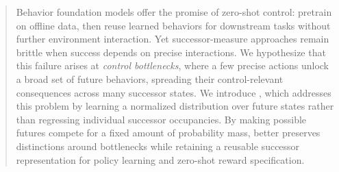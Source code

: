     

\begin{abstract}
Behavior foundation models offer the promise of zero-shot control: pretrain on offline data, then reuse learned behaviors for downstream tasks without further environment interaction.
Yet successor-measure approaches remain brittle when success depends on precise interactions.
We hypothesize that this failure arises at \emph{control bottlenecks}, where a few precise actions unlock a broad set of future behaviors, spreading their control-relevant consequences across many successor states.
We introduce \name{}, which addresses this problem by learning a normalized distribution over future states rather than regressing individual successor occupancies.
By making possible futures compete for a fixed amount of probability mass, \name{} better preserves distinctions around bottlenecks while retaining a reusable successor representation for policy learning and zero-shot reward specification.
\end{abstract}
    